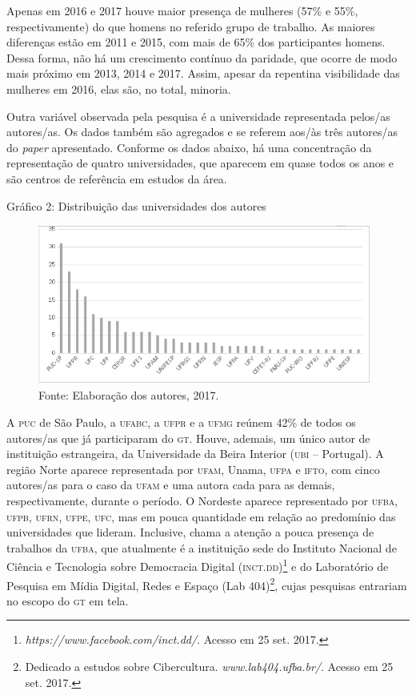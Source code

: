 Apenas em 2016 e 2017 houve maior presença de mulheres (57\% e 55\%,
respectivamente) do que homens no referido grupo de trabalho. As maiores
diferenças estão em 2011 e 2015, com mais de 65\% dos participantes
homens. Dessa forma, não há um crescimento contínuo da paridade, que
ocorre de modo mais próximo em 2013, 2014 e 2017. Assim, apesar da
repentina visibilidade das mulheres em 2016, elas são, no total,
minoria.

Outra variável observada pela pesquisa é a universidade representada
pelos/as autores/as. Os dados também são agregados e se referem aos/às
três autores/as do \emph{paper} apresentado. Conforme os dados abaixo,
há uma concentração da representação de quatro universidades, que
aparecem em quase todos os anos e são centros de referência em estudos
da área.

\begin{center}
Gráfico 2: Distribuição das universidades dos autores
\end{center}

\begin{figure}[!ht]
\centering
 \includegraphics[width=110mm]{./imgs/graf3_2.png}
\caption{Fonte: Elaboração dos autores, 2017.}
\end{figure}

A \textsc{puc} de São Paulo, a \textsc{ufabc}, a \textsc{ufpr} e a \textsc{ufmg} reúnem 42\% de todos os
autores/as que já participaram do \textsc{gt}. Houve, ademais, um único autor de
instituição estrangeira, da Universidade da Beira Interior (\textsc{ubi} --
Portugal). A região Norte aparece representada por \textsc{ufam}, Unama, \textsc{ufpa} e
\textsc{ifto}, com cinco autores/as para o caso da \textsc{ufam} e uma autora cada para as
demais, respectivamente, durante o período. O Nordeste aparece
representado por \textsc{ufba}, \textsc{ufpb}, \textsc{ufrn}, \textsc{ufpe}, \textsc{ufc}, mas em pouca quantidade em
relação ao predomínio das universidades que lideram. Inclusive, chama a
atenção a pouca presença de trabalhos da \textsc{ufba}, que atualmente é a
instituição sede do Instituto Nacional de Ciência e Tecnologia sobre
Democracia Digital (\textsc{inct}.\textsc{dd})\footnote{\emph{https://www.facebook.com/inct.dd/}.
  Acesso em 25 set. 2017.} e do Laboratório de Pesquisa em Mídia
Digital, Redes e Espaço (Lab 404)\footnote{Dedicado a estudos sobre
  Cibercultura. \emph{www.lab404.ufba.br/}.
  Acesso em 25 set. 2017.}, cujas pesquisas entrariam no escopo do \textsc{gt} em
tela.

